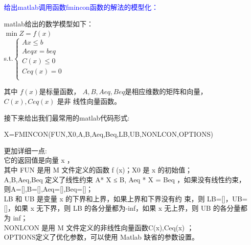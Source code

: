\documentclass[a4paper,20pt]{article}
\begin{document}
\par \noindent \large \textcolor{blue}{给出matlab调用函数fmincon函数的解法的模型化：}
\par \noindent matlab给出的数学模型如下：
\\ $\min Z = f(x)$
\\s.t.$\left\{\begin{matrix}
        Ax\leq b   \\
        Aeqx = beq \\
        C(x)\leq 0 \\
        Ceq(x) = 0 \\
    \end{matrix}\right.$
\par 其中 $f (x)$是标量函数， $A, B, Aeq, Beq$是相应维数的矩阵和向量，$C(x),Ceq(x)$ 是非
线性向量函数。
\par 接下来给出我们最常用的matlab代码形式:
\begin{center}
    X=FMINCON(FUN,X0,A,B,Aeq,Beq,LB,UB,{NONLCON},{OPTIONS})
\end{center}
更加详细一点:
\\它的返回值是向量 x ，
\\其中 FUN 是用 M 文件定义的函数 f (x)；X0 是 x 的初始值；
\\A,B,Aeq,Beq 定义了线性约束 A* X ≤ B, Aeq * X = Beq ，如果没有线性约束，则A=[],B=[],Aeq=[],Beq=[]；
\\LB 和 UB 是变量 x 的下界和上界，如果上界和下界没有约
束，则 LB=[]，UB=[]，如果 x 无下界，则 LB 的各分量都为-inf，如果 x 无上界，则 UB
的各分量都为 inf；
\\NONLCON 是用 M 文件定义的非线性向量函数C(x),Ceq(x) ；
\\OPTIONS定义了优化参数，可以使用 Matlab 缺省的参数设置。
\end{document}
